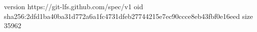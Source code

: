 version https://git-lfs.github.com/spec/v1
oid sha256:2dfd1ba40ba31d772a6a1fc4731dfeb27744215e7ec90ccce8eb43fbf0e16eed
size 35962
